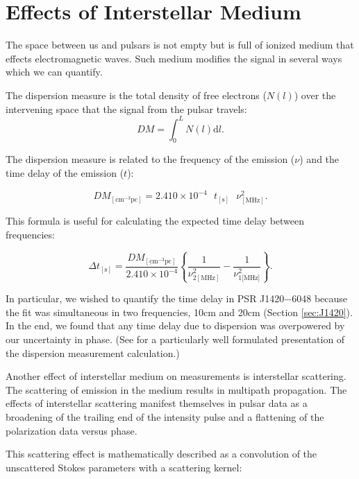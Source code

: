\section{Effects of Interstellar Medium} \label{sec:interstellarScattering}
The space between us and pulsars is not empty but is full
of ionized medium that effects electromagnetic waves.
Such medium modifies the signal in several ways which we can
quantify.

The dispersion measure is the total density of free electrons ($N(l)$) over the intervening space that the signal from the pulsar
travels:
\begin{equation} DM=\int_0^L N(l) \mathrm{d}l. \end{equation}

The dispersion measure is related to the frequency of the emission ($\nu$) and the time delay of the emission ($t$):

\begin{equation}DM_{[\textrm{cm}^{-3}\textrm{pc}]}=2.410\times10^{-4} \textrm{ } t_{[\textrm{s}]}\textrm{ } \nu^2_{[\textrm{MHz}]}.\end{equation}

This formula is useful for calculating the expected time delay between frequencies:

\begin{equation}
\Delta t_{[\textrm{s}]}= \frac{DM_{[\textrm{cm}^{-3}\textrm{pc}]}}{2.410\times 10^{-4}} \left\{  \frac{1}{\nu^2_{2 [\textrm{MHz}]}} - \frac{1}{\nu^2_{1 \lbrack\textrm{MHz}\rbrack}}  \right\}.\end{equation}

In particular, we wished to quantify the time delay in PSR J1420$-$6048 because the fit was simultaneous
in two frequencies, 10cm and 20cm (Section \ref{sec:J1420}).  
In the end, we found that any time delay due to dispersion
was overpowered by our uncertainty in phase. (See \cite{rohlfs2000tools} for a particularly well formulated
presentation of the dispersion measurement calculation.)

Another effect of interstellar medium on measurements is interstellar scattering.
The scattering of emission in the medium results in multipath propagation.  
The effects of interstellar scattering manifest themselves in pulsar data as
a broadening of the trailing end of the intensity pulse and a flattening of the polarization data versus
phase.

This scattering effect is mathematically described as a convolution of the unscattered
Stokes parameters with a scattering kernel:

